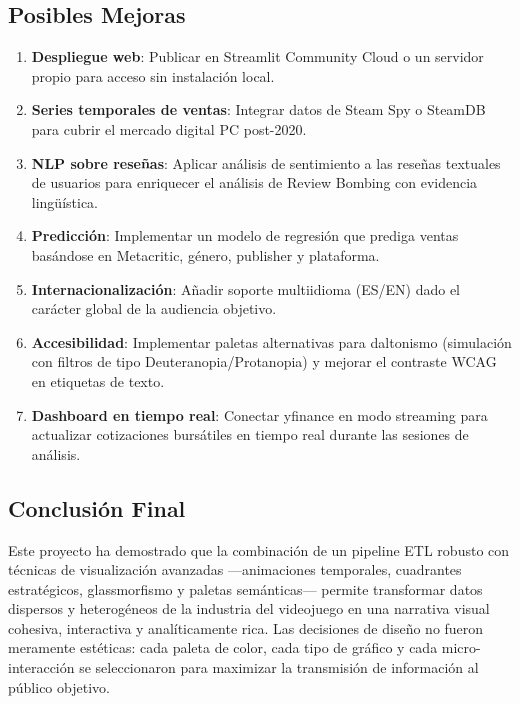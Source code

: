 \documentclass[11pt,a4paper]{article}
\begin{document}
\subsection{Posibles Mejoras}

\begin{enumerate}
  \item \textbf{Despliegue web}: Publicar en Streamlit Community Cloud o un servidor propio para acceso sin instalación local.
  \item \textbf{Series temporales de ventas}: Integrar datos de Steam Spy o SteamDB para cubrir el mercado digital PC post-2020.
  \item \textbf{NLP sobre reseñas}: Aplicar análisis de sentimiento a las reseñas textuales de usuarios para enriquecer el análisis de Review Bombing con evidencia lingüística.
  \item \textbf{Predicción}: Implementar un modelo de regresión que prediga ventas basándose en Metacritic, género, publisher y plataforma.
  \item \textbf{Internacionalización}: Añadir soporte multiidioma (ES/EN) dado el carácter global de la audiencia objetivo.
  \item \textbf{Accesibilidad}: Implementar paletas alternativas para daltonismo (simulación con filtros de tipo Deuteranopia/Protanopia) y mejorar el contraste WCAG en etiquetas de texto.
  \item \textbf{Dashboard en tiempo real}: Conectar yfinance en modo streaming para actualizar cotizaciones bursátiles en tiempo real durante las sesiones de análisis.
\end{enumerate}

\subsection{Conclusión Final}

Este proyecto ha demostrado que la combinación de un pipeline ETL robusto con técnicas de visualización avanzadas ---animaciones temporales, cuadrantes estratégicos, glassmorfismo y paletas semánticas--- permite transformar datos dispersos y heterogéneos de la industria del videojuego en una narrativa visual cohesiva, interactiva y analíticamente rica. Las decisiones de diseño no fueron meramente estéticas: cada paleta de color, cada tipo de gráfico y cada micro-interacción se seleccionaron para maximizar la transmisión de información al público objetivo.


\newpage
\appendix
\end{document}
